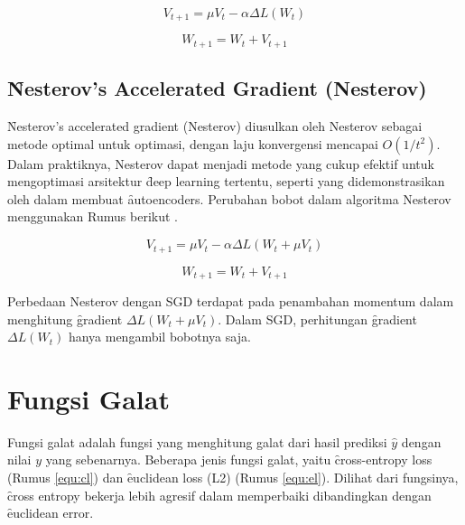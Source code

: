 \begin{equation}
\label{equ:sgd2}
V_{t+1} = \mu V_{t} - \alpha \Delta L(W_{t})
\end{equation}

\begin{equation}
\label{equ:sgd2-3}
W_{t+1} = W_{t} + V_{t+1}
\end{equation}
\subsection{\f{Nesterov's Accelerated Gradient} (Nesterov)}
\f{Nesterov's accelerated gradient} (Nesterov) diusulkan oleh Nesterov sebagai metode optimal untuk optimasi, dengan laju konvergensi mencapai $O(1/t^{2})$. Dalam praktiknya, Nesterov dapat menjadi metode yang cukup efektif untuk mengoptimasi arsitektur \f{deep learning} tertentu, seperti yang didemonstrasikan oleh  dalam membuat \f{autoencoders}. Perubahan bobot dalam algoritma Nesterov menggunakan Rumus berikut .

\begin{equation}
\label{equ:nesterov}
V_{t+1}=\mu V_{t} - \alpha\Delta L(W_{t} + \mu V_{t})
\end{equation}

\begin{equation}
W_{t+1} = W_{t} + V_{t+1}
\end{equation}

Perbedaan Nesterov dengan SGD terdapat pada penambahan momentum dalam menghitung \f{gradient} $\Delta L(W_{t} + \mu V_{t})$. Dalam SGD, perhitungan \f{gradient} $\Delta L(W_{t})$ hanya mengambil bobotnya saja.

\section{Fungsi Galat}
Fungsi galat adalah fungsi yang menghitung galat dari hasil prediksi $\hat{y}$ dengan nilai $y$ yang sebenarnya. Beberapa jenis fungsi galat, yaitu \f{cross-entropy loss} (Rumus \ref{equ:cl}) dan \f{euclidean loss} (L2) (Rumus \ref{equ:el}). Dilihat dari fungsinya, \f{cross entropy} bekerja lebih agresif dalam memperbaiki dibandingkan dengan \f{euclidean error}.

